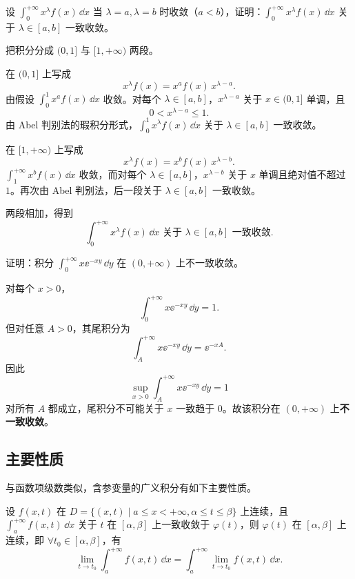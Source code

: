 \begin{xexercise}[2]
设 $\displaystyle\int_0^{+\infty}x^\lambda f(x)\,\dd x$ 当 $\lambda=a,\lambda=b$ 时收敛（$a<b$），证明：$\displaystyle\int_0^{+\infty}x^\lambda f(x)\,\dd x$ 关于 $\lambda\in[a,b]$ 一致收敛。
\end{xexercise}
\begin{xsolution}
把积分分成 $(0,1]$ 与 $[1,+\infty)$ 两段。

在 $(0,1]$ 上写成
\[
x^\lambda f(x)=x^a f(x)\,x^{\lambda-a}.
\]
由假设 $\int_0^1x^a f(x)\,\dd x$ 收敛。对每个 $\lambda\in[a,b]$，$x^{\lambda-a}$ 关于 $x\in(0,1]$ 单调，且
\[
0<x^{\lambda-a}\leqslant1.
\]
由 Abel 判别法的瑕积分形式，$\int_0^1x^\lambda f(x)\,\dd x$ 关于 $\lambda\in[a,b]$ 一致收敛。

在 $[1,+\infty)$ 上写成
\[
x^\lambda f(x)=x^b f(x)\,x^{\lambda-b}.
\]
$\int_1^{+\infty}x^b f(x)\,\dd x$ 收敛，而对每个 $\lambda\in[a,b]$，$x^{\lambda-b}$ 关于 $x$ 单调且绝对值不超过 $1$。再次由 Abel 判别法，后一段关于 $\lambda\in[a,b]$ 一致收敛。

两段相加，得到
\[
\boxed{\int_0^{+\infty}x^\lambda f(x)\,\dd x
\text{ 关于 }\lambda\in[a,b]\text{ 一致收敛}}.
\]
\end{xsolution}


\begin{xexercise}[3]
证明：积分 $\displaystyle\int_0^{+\infty}x\ee^{-xy}\,\dd y$ 在 $(0,+\infty)$ 上不一致收敛。
\end{xexercise}
\begin{xsolution}
对每个 $x>0$，
\[
\int_0^{+\infty}x\ee^{-xy}\,\dd y=1.
\]
但对任意 $A>0$，其尾积分为
\[
\int_A^{+\infty}x\ee^{-xy}\,\dd y=\ee^{-xA}.
\]
因此
\[
\sup_{x>0}\int_A^{+\infty}x\ee^{-xy}\,\dd y=1
\]
对所有 $A$ 都成立，尾积分不可能关于 $x$ 一致趋于 $0$。故该积分在 $(0,+\infty)$ 上\textbf{不一致收敛}。
\end{xsolution}


\subsection{主要性质}
与函数项级数类似，含参变量的广义积分有如下主要性质。

\begin{xproposition}[23.2.1（连续性）]
设 $f(x,t)$ 在 $D=\{(x,t)\mid a\leqslant x<+\infty,\alpha\leqslant t\leqslant\beta\}$ 上连续，且 $\displaystyle\int_a^{+\infty}f(x,t)\,\dd x$ 关于 $t$ 在 $[\alpha,\beta]$ 上一致收敛于 $\varphi(t)$，则 $\varphi(t)$ 在 $[\alpha,\beta]$ 上连续，即 $\forall t_0\in[\alpha,\beta]$，有
\[
  \lim_{t\to t_0}\int_a^{+\infty}f(x,t)\,\dd x=\int_a^{+\infty}\lim_{t\to t_0}f(x,t)\,\dd x.
\]
\end{xproposition}

